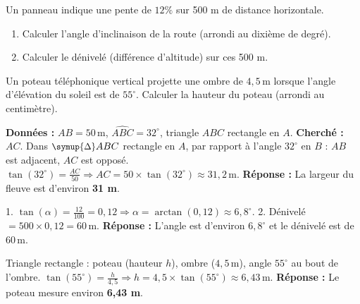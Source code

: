 \documentclass[11pt]{article}
\def\triangle{\mathord{\scalebox{0.9}{$\symup{\Delta}$}}}%
\begin{document}
\begin{exercice}
Un panneau indique une pente de $12\%$ sur 500 m de distance horizontale.
\begin{enumerate}
    \item Calculer l'angle d'inclinaison de la route (arrondi au dixième de degré).
    \item Calculer le dénivelé (différence d'altitude) sur ces 500 m.
\end{enumerate}
\end{exercice}

\begin{exercice}
Un poteau téléphonique vertical projette une ombre de $4,5\,\text{m}$ lorsque l'angle d'élévation du soleil est de $55^\circ$.
Calculer la hauteur du poteau (arrondi au centimètre).
\end{exercice}

\begin{corrige}
\textbf{Données :} $AB=50\,\text{m}$, $\widehat{ABC}=32^\circ$, triangle $ABC$ rectangle en $A$.
\textbf{Cherché :} $AC$.
Dans $\triangle ABC$ rectangle en $A$, par rapport à l'angle $32^\circ$ en $B$ : $AB$ est adjacent, $AC$ est opposé.
$\tan(32^\circ) = \frac{AC}{50} \Rightarrow AC = 50 \times \tan(32^\circ) \approx 31,2\,\text{m}$.
\textbf{Réponse :} La largeur du fleuve est d'environ \textbf{31 m}.
\end{corrige}

\begin{corrige}
1. $\tan(\alpha) = \frac{12}{100} = 0,12 \Rightarrow \alpha = \arctan(0,12) \approx 6,8^\circ$.
2. Dénivelé $= 500 \times 0,12 = 60\,\text{m}$.
\textbf{Réponse :} L'angle est d'environ $6,8^\circ$ et le dénivelé est de $60\,\text{m}$.
\end{corrige}

\begin{corrige}
Triangle rectangle : poteau (hauteur $h$), ombre ($4,5\,\text{m}$), angle $55^\circ$ au bout de l'ombre.
$\tan(55^\circ) = \frac{h}{4,5} \Rightarrow h = 4,5 \times \tan(55^\circ) \approx 6,43\,\text{m}$.
\textbf{Réponse :} Le poteau mesure environ \textbf{6,43 m}.
\end{corrige}
\end{document}
